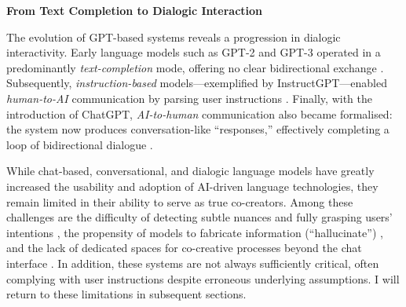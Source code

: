 \textbf{From Text Completion to Dialogic Interaction}

The evolution of GPT-based systems reveals a progression in dialogic interactivity. Early language models such as GPT-2 and GPT-3 operated in a predominantly \textit{text-completion} mode, offering no clear bidirectional exchange \citep{Brown2020-js}. Subsequently, \textit{instruction-based} models—exemplified by InstructGPT—enabled \textit{human-to-AI} communication by parsing user instructions \citep{OpenAI2022-pj}. Finally, with the introduction of ChatGPT, \textit{AI-to-human} communication also became formalised: the system now produces conversation-like ``responses,'' effectively completing a loop of bidirectional dialogue \citep{OpenAI2022-wx}.

\begin{table}[h!]
\centering
{}
\caption{Progression of Communication Models in Generative AI}
\label{tab:communication_progression}
\end{table}

While chat-based, conversational, and dialogic language models have greatly increased the usability and adoption of AI-driven language technologies, they remain limited in their ability to serve as true co-creators. Among these challenges are the difficulty of detecting subtle nuances and fully grasping users' intentions \citep{Bown2024-yx}, the propensity of models to fabricate information (``hallucinate'') \citep{Alkaissi2023-tp}, and the lack of dedicated spaces for co-creative processes beyond the chat interface \citep{Ocampo2024-dv}. In addition, these systems are not always sufficiently critical, often complying with user instructions despite erroneous underlying assumptions. I will return to these limitations in subsequent sections.


